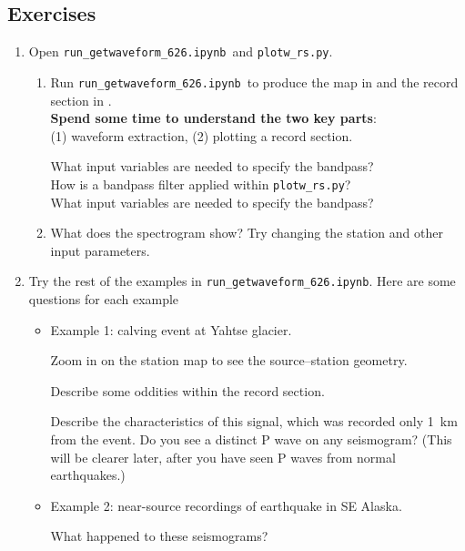 \documentclass[11pt,titlepage,fleqn]{article}
\newcommand{\tfile}{{\tt run\_getwaveform\_626.ipynb}}
\begin{document}

\subsection*{Exercises}

\begin{enumerate}

\item Open \tfile\ and \verb+plotw_rs.py+.
%
\begin{enumerate}
\item Run \tfile\ to produce the map in  and the record section in . \\
{\bf Spend some time to understand the two key parts}: \\
(1) waveform extraction, (2) plotting a record section.

What input variables are needed to specify the bandpass? \\
How is a bandpass filter applied within \verb+plotw_rs.py+? \\
What input variables are needed to specify the bandpass?

\item What does the spectrogram show? Try changing the station and other input parameters.

\end{enumerate}


\item Try the rest of the examples in \tfile. Here are some questions for each example
%
\begin{itemize}
\item Example 1: calving event at Yahtse glacier. 

Zoom in on the station map to see the source--station geometry.

Describe some oddities within the record section.

Describe the characteristics of this signal, which was recorded only 1~km from the event. Do you see a distinct P wave on any seismogram? (This will be clearer later, after you have seen P waves from normal earthquakes.)

\item Example 2: near-source recordings of  earthquake in SE Alaska. 

What happened to these seismograms?


\end{itemize}
\end{enumerate}
\end{document}
